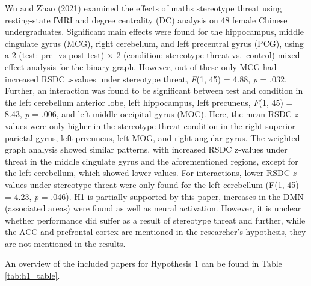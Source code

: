\documentclass[
  stu, a4paper,floatsintext]{apa7}
\begin{document}
Wu and Zhao (2021) examined the effects of maths stereotype threat using resting-state fMRI and degree centrality (DC) analysis on 48 female Chinese undergraduates.
Significant main effects were found for the hippocampus, middle cingulate gyrus (MCG), right cerebellum, and left precentral gyrus (PCG), using a 2 (test: pre- vs post-test) \(\times\) 2 (condition: stereotype threat vs.~control) mixed-effect analysis for the binary graph.
However, out of these only MCG had increased RSDC \emph{z}-values under stereotype threat, \emph{F}(1, 45) = 4.88, \emph{p} = .032.
Further, an interaction was found to be significant between test and condition in the left cerebellum anterior lobe, left hippocampus, left precuneus, \emph{F}(1, 45) = 8.43, \emph{p} = .006, and left middle occipital gyrus (MOC).
Here, the mean RSDC \emph{z}-values were only higher in the stereotype threat condition in the right superior parietal gyrus, left precuneus, left MOG, and right angular gyrus.
The weighted graph analysis showed similar patterns, with increased RSDC z-values under threat in the middle cingulate gyrus and the aforementioned regions, except for the left cerebellum, which showed lower values.
For interactions, lower RSDC \emph{z}-values under stereotype threat were only found for the left cerebellum (F(1, 45) = 4.23, \emph{p} = .046).
H1 is partially supported by this paper, increases in the DMN (associated areas) were found as well as neural activation. However, it is unclear whether performance did suffer as a result of stereotype threat and further, while the ACC and prefrontal cortex are mentioned in the researcher's hypothesis, they are not mentioned in the results.

An overview of the included papers for Hypothesis 1 can be found in Table \ref{tab:h1_table}.
\end{document}
